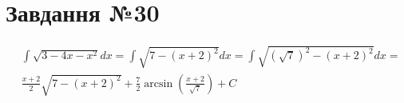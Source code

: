 \documentclass{report}
\begin{document}
\section{Завдання №30}
\begin{equation}\begin{split}
	& \int\sqrt{3 - 4x - x^2}dx = \int\sqrt{7 - (x + 2)^2}dx = \int\sqrt{(\sqrt{7})^2 - (x + 2)^2}dx =\\
	& \frac{x + 2}{2}\sqrt{7 - (x + 2)^2} + \frac{7}{2}\arcsin\left(\frac{x + 2}{\sqrt{7}}\right) + C
\end{split}\end{equation}
\end{document}
